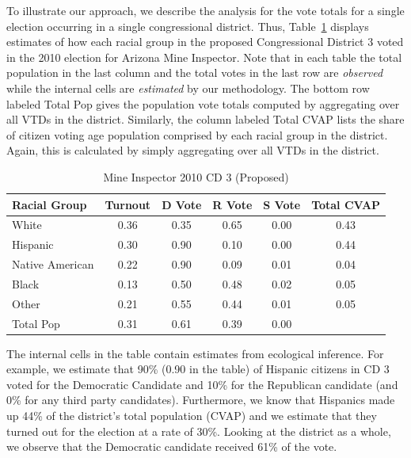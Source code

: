 \documentclass[12pt]{article}
\begin{document}
To illustrate our approach, we describe the analysis for the vote
totals for a single election occurring in a single congressional
district.  Thus, Table~\ref{smine_cvap_cd_3_ex} displays estimates of
how each racial group in the proposed Congressional District 3 voted
in the 2010 election for Arizona Mine Inspector. Note that in each
table the total population in the last column and the total votes in
the last row are {\it observed} while the internal cells are {\it estimated} 
by our methodology. The bottom row labeled Total Pop
gives the population vote totals computed by aggregating over all VTDs
in the district.  Similarly, the column labeled Total CVAP lists the
share of citizen voting age population comprised by each racial group
in the district.  Again, this is calculated by simply aggregating over
all VTDs in the district.

\begin{table}[ht]
\begin{center}
\caption{\label{smine_cvap_cd_3_ex}Mine Inspector 2010 CD 3 (Proposed)}
\begin{tabular}{lccccc}
  \hline
Racial Group & Turnout & D Vote & R Vote & S Vote & Total CVAP\\ 
  \hline
White & 0.36 & 0.35 & 0.65 & 0.00 & 0.43 \\ 
  Hispanic & 0.30 & 0.90 & 0.10 & 0.00 & 0.44 \\ 
  Native American & 0.22 & 0.90 & 0.09 & 0.01 & 0.04 \\ 
  Black & 0.13 & 0.50 & 0.48 & 0.02 & 0.05 \\ 
  Other & 0.21 & 0.55 & 0.44 & 0.01 & 0.05 \\ 
  Total Pop & 0.31 & 0.61 & 0.39 & 0.00 &  \\ 
   \hline
\end{tabular}
\end{center}
\end{table}

The internal cells in the table contain estimates from ecological
inference. For example, we estimate that 90\% (0.90 in the table) of
Hispanic citizens in CD 3 voted for the Democratic Candidate and 10\%
for the Republican candidate (and 0\% for any third party candidates).
Furthermore, we know that Hispanics made up 44\% of the district's
total population (CVAP) and we estimate that they turned out for the
election at a rate of 30\%.  Looking at the district as a whole, we
observe that the Democratic candidate received 61\% of the vote. 

\end{document}
